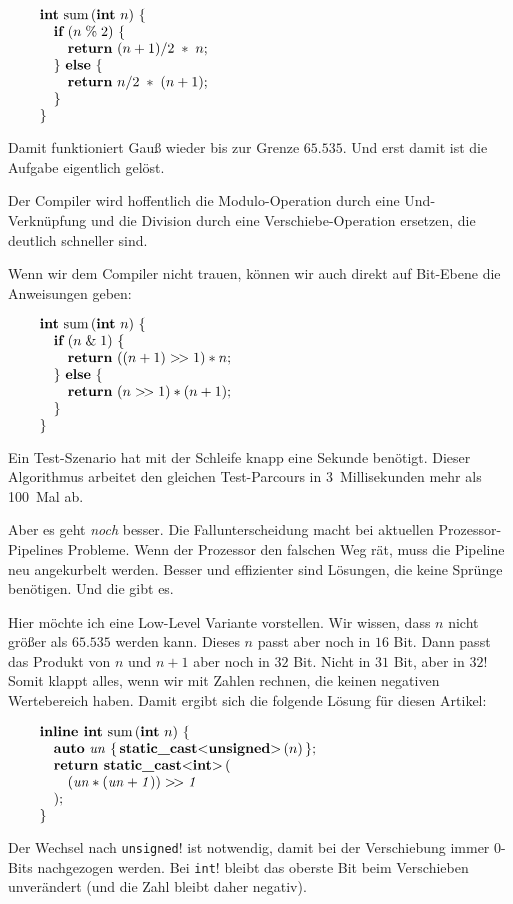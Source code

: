 $$\vbox{\obeylines
{\bf int} sum$\,$({\bf int} $n$) $\{$
\quad {\bf if} ($n\mathrel\% 2$) $\{$
\qquad {\bf return} $(n + 1)/2\;*\;n$;
\quad $\}$ {\bf else} $\{$
\qquad {\bf return} $n/2 \;*\; (n + 1)$;
\quad $\}$
$\}$}$$

\noindent Damit funktioniert Gauß wieder bis zur Grenze $65.535$.
Und erst damit ist die Aufgabe eigentlich gelöst.

Der Compiler wird hoffentlich die Modulo-Operation durch eine
Und-Verknüpfung und die Division durch eine
Verschiebe-Operation ersetzen, die deutlich schneller sind.

Wenn wir dem Compiler nicht trauen, können wir auch direkt
auf Bit-Ebene die Anweisungen geben:

$$\vbox{\obeylines
{\bf int} sum$\,$({\bf int} $n$) $\{$
\quad {\bf if} ($n \mathrel\& 1$) $\{$
\qquad {\bf return} $((n + 1) >\!> 1) * n$;
\quad $\}$ {\bf else} $\{$
\qquad {\bf return} $(n >\!> 1) * (n + 1)$;
\quad $\}$
$\}$}$$

\noindent Ein Test-Szenario hat mit der Schleife knapp eine Sekunde benötigt.
Dieser Algorithmus arbeitet den gleichen Test-Parcours in 3~Millisekunden
mehr als 100~Mal ab.

Aber es geht {\it noch\/} besser.
Die Fallunterscheidung macht bei aktuellen Prozessor-Pipelines
Probleme.
Wenn der Prozessor den falschen Weg rät, muss die
Pipeline neu angekurbelt werden.
Besser und effizienter sind Lösungen, die keine
Sprünge benötigen.
Und die gibt es.

Hier möchte ich eine Low-Level Variante vorstellen.
Wir wissen, dass $n$ nicht größer als $65.535$ werden
kann.
Dieses $n$ passt aber noch in $16$ Bit.
Dann passt das Produkt von $n$ und $n+1$ aber noch in
$32$ Bit.
Nicht in $31$ Bit, aber in $32$!
Somit klappt alles, wenn wir mit Zahlen rechnen, die
keinen negativen Wertebereich haben.
Damit ergibt sich die folgende Lösung für diesen Artikel:

$$\vbox{\obeylines
{\bf inline int} sum$\,$({\bf int} $n$) $\{$
\quad {\bf auto} $\it un$ $\{\,${\bf static\_cast}<{\bf unsigned}>$\,$($n$)$\,\}$;
\quad {\bf return static\_cast}<{\bf int}>$\,$(
\qquad $(\it un * (\it un + 1)) >\!> 1$
\quad );
$\}$}$$

\noindent Der Wechsel nach \lstinline{unsigned}! ist notwendig, damit
bei der Verschiebung immer $0$-Bits nachgezogen werden.
Bei \lstinline{int}! bleibt das oberste Bit beim Verschieben unverändert
(und die Zahl bleibt daher negativ).

